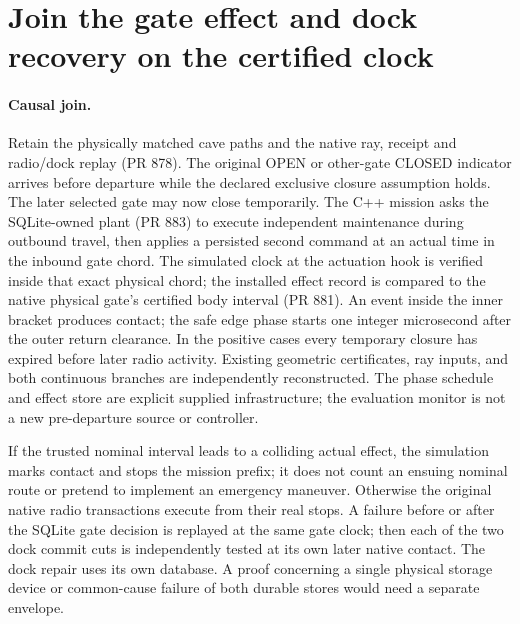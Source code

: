 \documentclass{article}
\begin{document}
\section*{Join the gate effect and dock recovery on the certified clock}
\paragraph{Causal join.}
Retain the physically matched cave paths and the native ray, receipt
and radio/dock replay (PR 878). The original OPEN or other-gate
CLOSED indicator arrives before departure while the declared exclusive
closure assumption holds. The later selected gate may now close
temporarily. The C++ mission asks the SQLite-owned plant (PR 883) to
execute independent maintenance during outbound travel, then applies
a persisted second command at an actual time in the inbound gate
chord. The simulated clock at the actuation hook is verified inside
that exact physical chord; the installed effect record is compared to
the native physical gate's certified body interval (PR 881). An event
inside the inner bracket produces contact; the safe edge phase starts
one integer microsecond after the outer return clearance. In the
positive cases every temporary closure has expired before later radio
activity. Existing geometric certificates, ray inputs, and both
continuous branches are independently reconstructed. The phase
schedule and effect store are explicit supplied infrastructure; the
evaluation monitor is not a new pre-departure source or controller.

If the trusted nominal interval leads to a colliding actual effect,
the simulation marks contact and stops the mission prefix; it does
not count an ensuing nominal route or pretend to implement an
emergency maneuver. Otherwise the original native radio transactions
execute from their real stops. A failure before or after the
SQLite gate decision is replayed at the same gate clock; then each
of the two dock commit cuts is independently tested at its own later
native contact. The dock repair uses its own database. A proof
concerning a single physical storage device or common-cause failure
of both durable stores would need a separate envelope.
\end{document}
